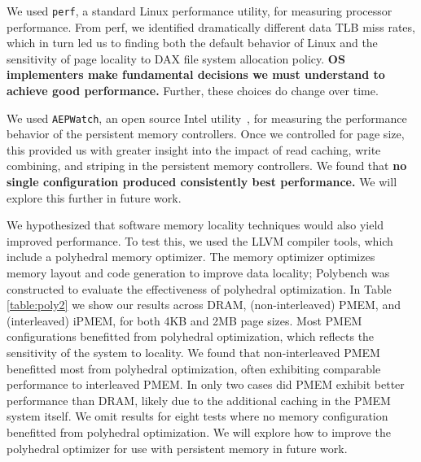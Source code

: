 We used \texttt{perf}, a standard Linux performance utility, for measuring processor performance.  From perf, we identified dramatically different data TLB miss rates, which in turn led us to finding both the default behavior of Linux and the sensitivity of page locality to DAX file system allocation policy.  \textbf{OS implementers make fundamental decisions we must understand to achieve good performance.} Further, these choices do change over time.

We used \texttt{AEPWatch}, an open source Intel utility~\cite{IntelAEPWatch}, for measuring the performance behavior of the persistent memory controllers. Once we controlled for page size, this provided us with greater insight into the impact of read caching, write combining, and striping in the persistent memory controllers.  We found that \textbf{no single configuration produced consistently best performance.}  We will explore this further in future work.

We hypothesized that software memory locality techniques would also yield improved performance.  To test this, we used the LLVM compiler tools, which include a polyhedral memory optimizer. The memory optimizer optimizes memory layout and code generation to improve data locality; Polybench was constructed to evaluate the effectiveness of polyhedral optimization.  In Table \ref{table:poly2} we show our results across DRAM, (non-interleaved) PMEM, and (interleaved) iPMEM, for both 4KB and 2MB page sizes.  Most PMEM configurations benefitted from polyhedral optimization, which reflects the sensitivity of the system to locality. We found that non-interleaved PMEM benefitted most from polyhedral optimization, often exhibiting comparable performance to interleaved PMEM.  In only two cases did PMEM exhibit better performance than DRAM, likely due to the additional caching in the PMEM system itself. We omit results for eight tests where no memory configuration benefitted from polyhedral optimization. We will explore how to improve the polyhedral optimizer for use with persistent memory in future work.

